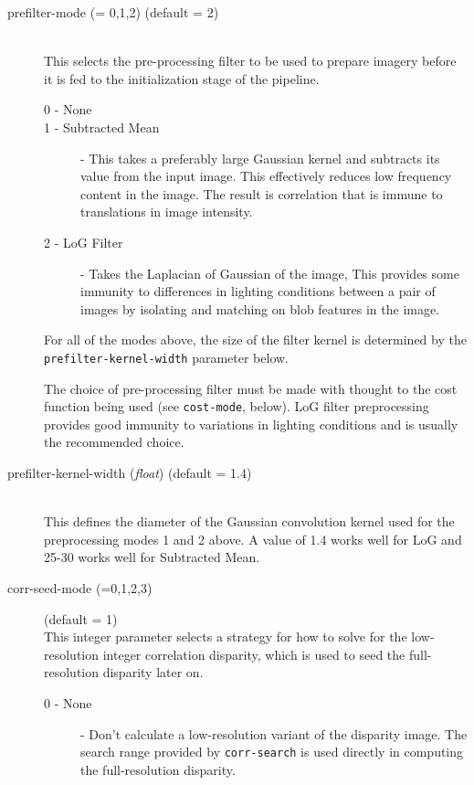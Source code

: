 \begin{description}

\item[prefilter-mode \textnormal{\small{(= 0,1,2)}} (default = 2)] \hfill \\
  This selects the pre-processing filter to be used to prepare imagery
  before it is fed to the initialization stage of the pipeline.

  \begin{description}
    \item[0 - None]
    \item[1 - Subtracted Mean] - This takes a preferably large
      Gaussian kernel and subtracts its value from the input
      image. This effectively reduces low frequency content in the
      image. The result is correlation that is immune to translations
      in image intensity.
    \item[2 - LoG Filter] - Takes the Laplacian of Gaussian of the
      image, This provides some immunity to differences in lighting
      conditions between a pair of images by isolating and matching on
      blob features in the image.
  \end{description}

  For all of the modes above, the size of the filter kernel is
  determined by the \texttt{prefilter-kernel-width} parameter below.

  The choice of pre-processing filter must be made with thought to the
  cost function being used (see \texttt{cost-mode}, below).  LoG filter
  preprocessing provides good immunity to variations in lighting
  conditions and is usually the recommended choice.

\item[prefilter-kernel-width \textnormal{\small{(\emph{float})}} (default = 1.4)] \hfill \\
  This defines the diameter of the Gaussian convolution kernel used
  for the preprocessing modes 1 and 2 above. A value of 1.4 works
  well for LoG and 25-30 works well for Subtracted Mean.

\item[corr-seed-mode \textnormal{\small{(=0,1,2,3)}}] (default = 1) \hfill \\
  This integer parameter selects a strategy for how to solve for the
  low-resolution integer correlation disparity, which is used to seed
  the full-resolution disparity later on.

  \begin{description}
  \item[0 - None] - Don't calculate a low-resolution variant of the
    disparity image. The search range provided by \texttt{corr-search}
    is used directly in computing the full-resolution disparity.


\end{description}
\end{description}
